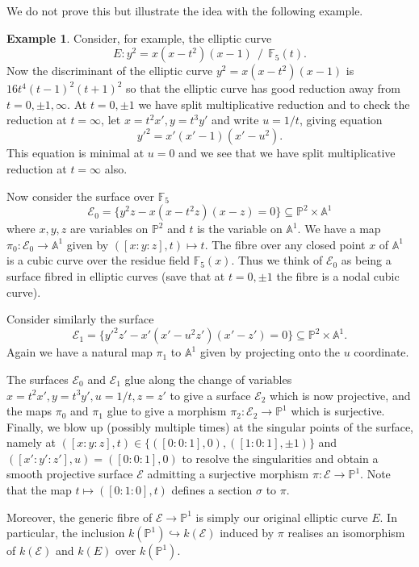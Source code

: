 \documentclass[12pt]{amsart}
\numberwithin{equation}{section}
\theoremstyle{remark}
\theoremstyle{definition}
\newtheorem{example}[equation]{Example}
\theoremstyle{definition}
\theoremstyle{definition}
\theoremstyle{definition}
\theoremstyle{definition}
\theoremstyle{definition}
\theoremstyle{definition}
\begin{document}
We do not prove this but illustrate the idea with the following example. 

\begin{example}
Consider, for example, the elliptic curve 
\[E:y^2=x(x-t^2)(x-1)~~ /~~ \mathbb{F}_5(t).\]
Now the discriminant of the elliptic curve $y^2=x(x-t^2)(x-1)$ is $16t^4(t-1)^2(t+1)^2$ so that the elliptic curve has good reduction away from $t=0,\pm 1, \infty$. At $t=0,\pm1$ we have split multiplicative reduction and to check the reduction at $t=\infty$, let $x=t^2x', y=t^3y'$ and write $u=1/t$, giving equation
\[y'^2=x'(x'-1)(x'-u^2).\]
This equation is minimal  at $u=0$ and we see that we have split multiplicative reduction  at $t=\infty$ also. 

Now consider the surface over $\mathbb{F}_5$
\[\mathcal{E}_0 =\{y^2z-x(x-t^2z)(x-z)=0\} \subseteq \mathbb{P}^2\times \mathbb{A}^1\]
where $x,y,z$ are variables on $\mathbb{P}^2$ and $t$ is the variable on $\mathbb{A}^1$. We have a map $\pi_0:\mathcal{E}_0\rightarrow \mathbb{A}^1$ given by $([x:y:z],t)\mapsto t$. The fibre over any closed point $x$ of $\mathbb{A}^1$ is a cubic curve over the residue field $\mathbb{F}_5(x)$. Thus we think of $\mathcal{E}_0$ as being a surface fibred in elliptic curves (save that at $t=0,\pm 1$ the fibre is a nodal cubic curve). 

Consider similarly the surface 
\[\mathcal{E}_1=\{y'^2z'-x'(x'-u^2z')(x'-z')=0\}\subseteq \mathbb{P}^2\times \mathbb{A}^1.\]
Again we have a natural map $\pi_1$ to $\mathbb{A}^1$ given by projecting onto the $u$ coordinate. 

The surfaces $\mathcal{E}_0$ and $\mathcal{E}_1$ glue along the change of variables $x=t^2x',y=t^3y', u=1/t, z=z'$ to give a surface $\mathcal{E}_2$ which is now projective, and the maps $\pi_0$ and $\pi_1$ glue to give a morphism $\pi_2:\mathcal{E}_2\rightarrow \mathbb{P}^1$ which is surjective. Finally, we blow up (possibly multiple times) at the singular points of the surface, namely at $([x:y:z],t)\in \{([0:0:1],0),([1:0:1],\pm 1)\}$ and $([x':y':z'],u)=([0:0:1],0)$ to resolve the singularities and obtain a smooth projective surface $\mathcal{E}$ admitting a surjective morphism $\pi:\mathcal{E}\rightarrow \mathbb{P}^1$. Note that the map $t\mapsto ([0:1:0],t)$ defines a section $\sigma$ to $\pi$. 

Moreover, the generic fibre of $\mathcal{E}\rightarrow \mathbb{P}^1$ is simply our original elliptic curve $E$. In particular, the inclusion $k(\mathbb{P}^1)\hookrightarrow k(\mathcal{E})$ induced by $\pi$ realises an isomorphism of $k(\mathcal{E})$ and $k(E)$ over $k(\mathbb{P}^1)$.  
\end{example}
\end{document}
